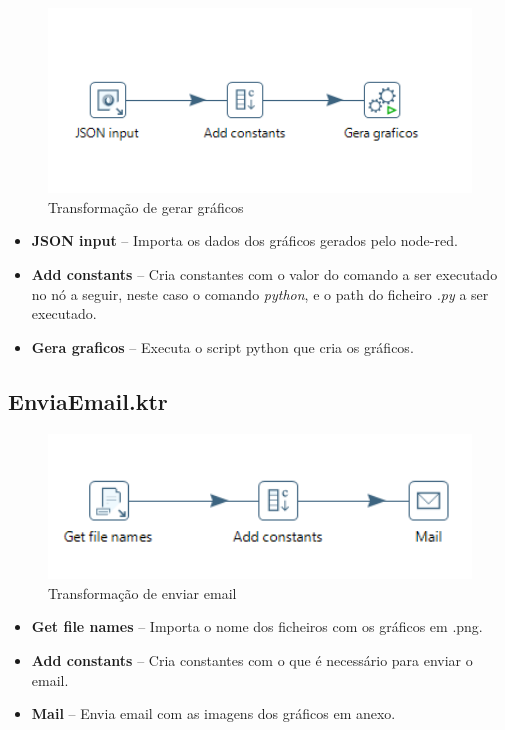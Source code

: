 \documentclass[a4paper, 12pt]{article} %
\begin{document}
\begin{figure}[h] 
	\centering 
	\includegraphics[width=1\textwidth]{images/gera_graficos.png}
	\caption{Transformação de gerar gráficos}
	\label{fig:transformacao_gera_graficos}
\end{figure}

\begin{itemize}
	\item \textbf{JSON input} – Importa os dados dos gráficos gerados pelo node-red.
	\item \textbf{Add constants} – Cria constantes com o valor do comando a ser executado no nó a seguir, neste caso o comando \textit{python}, e o path do ficheiro \textit{.py} a ser executado.
	\item \textbf{Gera graficos} – Executa o script python que cria os gráficos.
\end{itemize}
\newpage
\subsection{EnviaEmail.ktr}

\begin{figure}[h] 
	\centering 
	\includegraphics[width=1\textwidth]{images/envia_email.png}
	\caption{Transformação de enviar email}
	\label{fig:transformacao_envia_email}
\end{figure}

\begin{itemize}
	\item \textbf{Get file names} – Importa o nome dos ficheiros com os gráficos em .png.
	\item \textbf{Add constants} – Cria constantes com o que é necessário para enviar o email.
	\item \textbf{Mail} – Envia email com as imagens dos gráficos em anexo.
\end{itemize}
\end{document}
